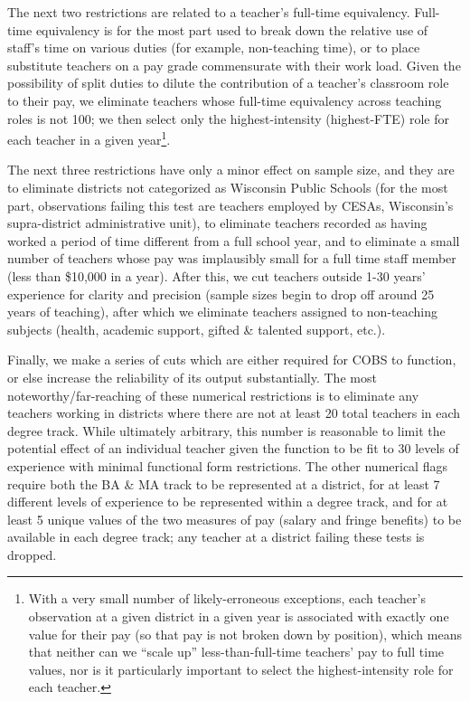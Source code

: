 \documentclass[]{article}
\let\rmarkdownfootnote\footnote%
\def\footnote{\protect\rmarkdownfootnote}
\begin{document}
The next two restrictions are related to a teacher's full-time
equivalency. Full-time equivalency is for the most part used to break
down the relative use of staff's time on various duties (for example,
non-teaching time), or to place substitute teachers on a pay grade
commensurate with their work load. Given the possibility of split duties
to dilute the contribution of a teacher's classroom role to their pay,
we eliminate teachers whose full-time equivalency across teaching roles
is not 100; we then select only the highest-intensity (highest-FTE) role
for each teacher in a given year\footnote{With a very small number of
  likely-erroneous exceptions, each teacher's observation at a given
  district in a given year is associated with exactly one value for
  their pay (so that pay is not broken down by position), which means
  that neither can we ``scale up'' less-than-full-time teachers' pay to
  full time values, nor is it particularly important to select the
  highest-intensity role for each teacher.}.

The next three restrictions have only a minor effect on sample size, and
they are to eliminate districts not categorized as Wisconsin Public
Schools (for the most part, observations failing this test are teachers
employed by CESAs, Wisconsin's supra-district administrative unit), to
eliminate teachers recorded as having worked a period of time different
from a full school year, and to eliminate a small number of teachers
whose pay was implausibly small for a full time staff member (less than
\$10,000 in a year). After this, we cut teachers outside 1-30 years'
experience for clarity and precision (sample sizes begin to drop off
around 25 years of teaching), after which we eliminate teachers assigned
to non-teaching subjects (health, academic support, gifted \& talented
support, etc.).

Finally, we make a series of cuts which are either required for COBS to
function, or else increase the reliability of its output substantially.
The most noteworthy/far-reaching of these numerical restrictions is to
eliminate any teachers working in districts where there are not at least
20 total teachers in each degree track. While ultimately arbitrary, this
number is reasonable to limit the potential effect of an individual
teacher given the function to be fit to 30 levels of experience with
minimal functional form restrictions. The other numerical flags require
both the BA \& MA track to be represented at a district, for at least 7
different levels of experience to be represented within a degree track,
and for at least 5 unique values of the two measures of pay (salary and
fringe benefits) to be available in each degree track; any teacher at a
district failing these tests is dropped.
\end{document}
